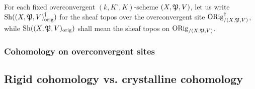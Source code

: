             \begin{convention}
                For each fixed overconvergent $(k, K^{\circ}, K)$-scheme $(X, \mathfrak{P}, V)$, let us write $\mathrm{Sh}((X, \mathfrak{P}, V)_{\mathrm{orig}}^{\dagger})$ for the sheaf topos over the overconvergent site $\mathrm{ORig}^{\dagger}_{/(X, \mathfrak{P}, V)}$, while $\mathrm{Sh}((X, \mathfrak{P}, V)_{\mathrm{orig}})$ shall mean the sheaf topos on $\mathrm{ORig}_{/(X, \mathfrak{P}, V)}$.
            \end{convention}
        
        \subsubsection{Cohomology on overconvergent sites}
        
    \subsection{Rigid cohomology vs. crystalline cohomology}